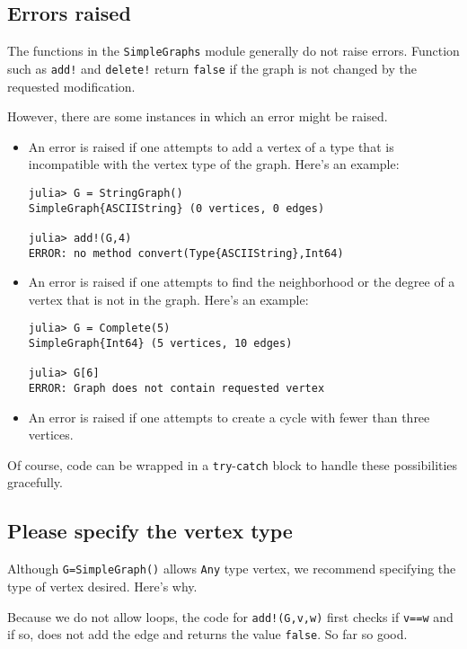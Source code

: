 \documentclass[oneside]{amsart}
\begin{document}
\subsection*{Errors raised}
The functions in the \verb|SimpleGraphs| module generally do not
raise errors. Function such as \verb|add!| and \verb|delete!| return
\verb|false| if the graph is not changed by the requested
modification.

However, there are some instances in which an error might be raised.
\begin{itemize}
\item An error is raised if one attempts to add a vertex of a type
  that is incompatible with the vertex type of the graph. Here's an
  example:
\begin{verbatim}
julia> G = StringGraph()
SimpleGraph{ASCIIString} (0 vertices, 0 edges)

julia> add!(G,4)
ERROR: no method convert(Type{ASCIIString},Int64)
\end{verbatim}

\item An error is raised if one attempts to find the neighborhood or
  the degree of a vertex that is not in the graph. Here's an example:
\begin{verbatim}
julia> G = Complete(5)
SimpleGraph{Int64} (5 vertices, 10 edges)

julia> G[6]
ERROR: Graph does not contain requested vertex
\end{verbatim}

\item An error is raised if one attempts to create a cycle with fewer
  than three vertices.
\end{itemize}

Of course, code can be wrapped in a \verb|try|-\verb|catch| block to
handle these possibilities gracefully.


\subsection*{Please specify the vertex type}
Although \verb|G=SimpleGraph()| allows \verb|Any| type vertex, we
recommend specifying the type of vertex desired. Here's why.

Because we do not allow loops, the code for \verb|add!(G,v,w)| first
checks if \verb|v==w| and if so, does not add the edge and returns the
value \verb|false|. So far so good.
\end{document}
